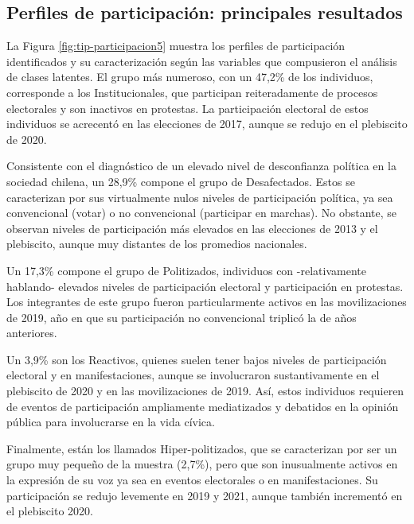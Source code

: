 \documentclass[
  12pt,
]{book}
\begin{document}
\hypertarget{perfiles-de-participaciuxf3n-principales-resultados}{%
\subsection*{Perfiles de participación: principales resultados}\label{perfiles-de-participaciuxf3n-principales-resultados}}

La Figura \ref{fig:tip-participacion5} muestra los perfiles de participación identificados y su caracterización según las variables que compusieron el análisis de clases latentes. El grupo más numeroso, con un 47,2\% de los individuos, corresponde a los Institucionales, que participan reiteradamente de procesos electorales y son inactivos en protestas. La participación electoral de estos individuos se acrecentó en las elecciones de 2017, aunque se redujo en el plebiscito de 2020.

Consistente con el diagnóstico de un elevado nivel de desconfianza política en la sociedad chilena, un 28,9\% compone el grupo de Desafectados. Estos se caracterizan por sus virtualmente nulos niveles de participación política, ya sea convencional (votar) o no convencional (participar en marchas). No obstante, se observan niveles de participación más elevados en las elecciones de 2013 y el plebiscito, aunque muy distantes de los promedios nacionales.

Un 17,3\% compone el grupo de Politizados, individuos con -relativamente hablando- elevados niveles de participación electoral y participación en protestas. Los integrantes de este grupo fueron particularmente activos en las movilizaciones de 2019, año en que su participación no convencional triplicó la de años anteriores.

Un 3,9\% son los Reactivos, quienes suelen tener bajos niveles de participación electoral y en manifestaciones, aunque se involucraron sustantivamente en el plebiscito de 2020 y en las movilizaciones de 2019. Así, estos individuos requieren de eventos de participación ampliamente mediatizados y debatidos en la opinión pública para involucrarse en la vida cívica.

Finalmente, están los llamados Hiper-politizados, que se caracterizan por ser un grupo muy pequeño de la muestra (2,7\%), pero que son inusualmente activos en la expresión de su voz ya sea en eventos electorales o en manifestaciones. Su participación se redujo levemente en 2019 y 2021, aunque también incrementó en el plebiscito 2020.
\end{document}
